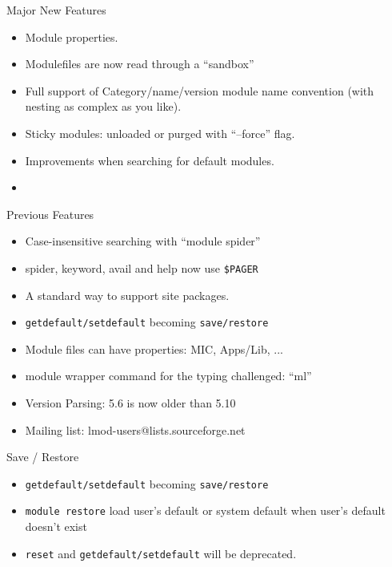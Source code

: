 \documentclass{beamer}
\begin{document}
\begin{frame}{Major New Features}
  \begin{itemize}
    \item Module properties.
    \item Modulefiles are now read through a ``sandbox''
    \item Full support of Category/name/version module name convention
      (with nesting as complex as you like).
    \item Sticky modules: unloaded or purged with ``--force'' flag.
    \item Improvements when searching for default modules.
    \item 
  \end{itemize}
\end{frame}
\begin{frame}{Previous Features}
  \begin{itemize}
    \item Case-insensitive searching with ``module spider''
    \item spider, keyword, avail and help now use \texttt{\$PAGER}
    \item A standard way to support site packages.
    \item \texttt{getdefault/setdefault} becoming \texttt{save/restore}
    \item Module files can have properties: MIC, Apps/Lib, ...
    \item module wrapper command for the typing challenged: ``ml''
    \item Version Parsing: 5.6 is now older than 5.10
    \item Mailing list: lmod-users@lists.sourceforge.net
  \end{itemize}
\end{frame}

\begin{frame}{Save / Restore}
  \begin{itemize}
    \item \texttt{getdefault/setdefault} becoming \texttt{save/restore}
    \item \texttt{module restore} load user's default or system
      default when user's default doesn't exist
    \item \texttt{reset} and \texttt{getdefault/setdefault} will be deprecated.
  \end{itemize}
\end{frame}
\end{document}
